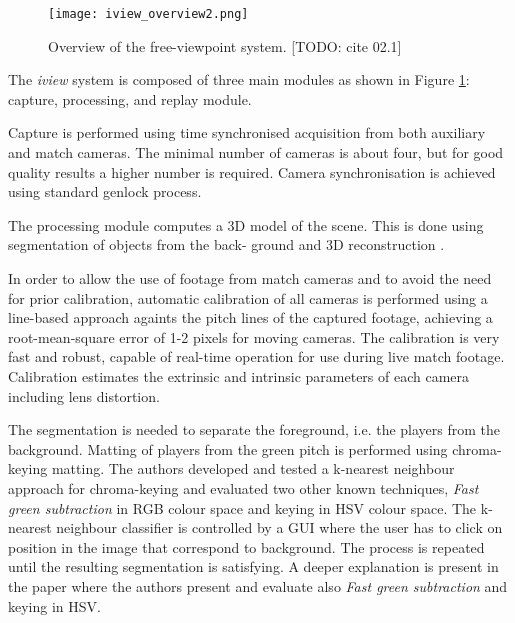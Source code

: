 
\begin{figure}[htbp]
\centerline{\texttt{[image: iview\_overview2.png]}}
\caption{Overview of the free-viewpoint system. [TODO: cite 02.1]}
\label{fig:iview_overview}
\end{figure}


The \textit{iview} system is composed of three main modules as shown in Figure \ref{fig:iview_overview}: 
capture, processing, and replay module.

Capture is performed using time synchronised acquisition from both auxiliary and
match cameras.
The minimal number of cameras is about four, but for good quality results a higher number is required.
Camera synchronisation is achieved using standard genlock process.

The processing module computes a 3D model of the scene.
This is done using segmentation of objects from the back-
ground and 3D reconstruction \cite{iview2.1}.

In order to allow the use of footage from match cameras and to avoid the need for prior calibration, 
automatic calibration of all cameras is performed using a line-based approach againts the pitch lines of the captured footage, 
achieving a root-mean-square error of 1-2 pixels for moving cameras. 
The calibration is very fast and robust, capable of real-time operation for use during live match footage. 
Calibration estimates the extrinsic and intrinsic parameters of each camera including lens distortion.

The segmentation is needed to separate the foreground, i.e. the players from the background.
Matting of players from the green pitch is performed using chroma-keying matting. 
The authors developed and tested a k-nearest neighbour approach for chroma-keying and evaluated two other known techniques,
\textit{Fast green subtraction} in RGB colour space and keying in HSV colour space.
The k-nearest neighbour classifier is controlled by a GUI where the user has to click on position in the image that correspond
to background. 
The process is repeated until the resulting segmentation is satisfying.
A deeper explanation is present in the paper \cite{iview2.1} where the authors present and evaluate also 
\textit{Fast green subtraction} and keying in HSV.



